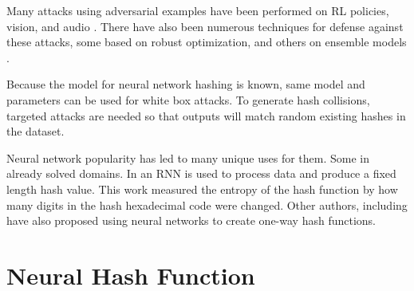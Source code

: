 \documentclass{article}
\begin{document}
Many attacks using adversarial examples have been performed on RL policies, vision,
and audio \cite{policy,intriguing,audio}. There have also been numerous techniques
for defense against these attacks, some based on robust optimization, and others
on ensemble models \cite{robust,ensemble}.

Because the model for neural network hashing is known, same model and parameters can be used for white box attacks. To generate hash collisions, targeted attacks are needed so that outputs will match random existing hashes in the dataset. 


Neural network popularity has led to many unique uses for them. Some in already
solved domains. In \cite{hash1} an RNN is used to process data and produce
a fixed length hash value. This work measured the entropy of the hash function
by how many digits in the hash hexadecimal code were changed. Other authors,
including \cite{hash2} have also proposed using neural networks to create
one-way hash functions.

\section{Neural Hash Function}


\end{document}
